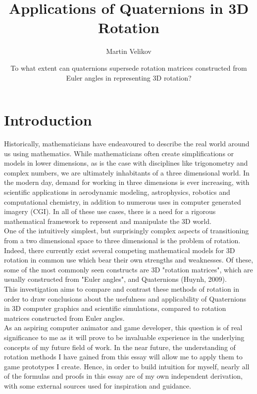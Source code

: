 \documentclass[12pt, a4paper]{article}
\title{\vspace{-2cm}Applications of Quaternions in 3D Rotation}
\author{Martin Velikov}
\date{To what extent can quaternions supersede rotation matrices constructed from Euler
    angles in representing 3D rotation?}
\begin{document}
\maketitle
\tableofcontents

\pagebreak

\section{Introduction}
Historically, mathematicians have endeavoured to describe the real world around
us using mathematics. While mathematicians often create simplifications or
models in lower dimensions, as is the case with disciplines like trigonometry
and complex numbers, we are ultimately inhabitants of a three dimensional world.
In the modern day, demand for working in three dimensions is ever increasing,
with scientific applications in aerodynamic modeling, astrophysics, robotics and
computational chemistry, in addition to numerous uses in computer generated
imagery (CGI). In all of these use cases, there is a need for a rigorous
mathematical framework to represent and manipulate the 3D world. \\

One of the intuitively simplest, but surprisingly complex aspects of
transitioning from a two dimensional space to three dimensional is the problem
of rotation. Indeed, there currently exist several competing mathematical models
for 3D rotation in common use which bear their own strengths and weaknesses. Of
these, some of the most commonly seen constructs are 3D "rotation matrices",
which are usually constructed from "Euler angles", and Quaternions (Huynh, 2009).\\

This investigation aims to compare and contrast these methods of rotation in
order to draw conclusions about the usefulness and applicability of Quaternions
in 3D computer graphics and scientific simulations, compared to rotation matrices
constructed from Euler angles. \\

As an aspiring computer animator and game developer, this question is of real
significance to me as it will prove to be invaluable experience in the
underlying concepts of my future field of work. In the near future, the
understanding of rotation methods I have gained from this essay will allow me to
apply them to game prototypes I create. Hence, in order to build intuition for
myself, nearly all of the formulas and proofs in this essay are of my own
independent derivation, with some external sources used for inspiration and
guidance. \\
\end{document}
